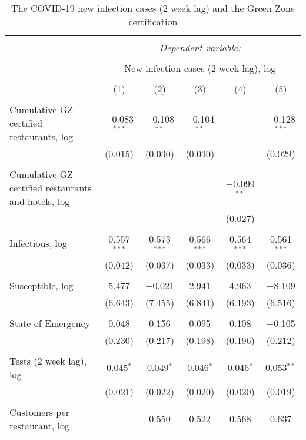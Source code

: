 
\begin{table}[!htbp] \centering 
  \caption{The COVID-19 new infection cases (2 week lag) and the Green Zone certification} 
  \label{} 
\begin{tabular}{@{\extracolsep{5pt}}lccccc} 
\\[-1.8ex]\hline 
\hline \\[-1.8ex] 
 & \multicolumn{5}{c}{\textit{Dependent variable:}} \\ 
\cline{2-6} 
\\[-1.8ex] & \multicolumn{5}{c}{New infection cases (2 week lag), log} \\ 
\\[-1.8ex] & (1) & (2) & (3) & (4) & (5)\\ 
\hline \\[-1.8ex] 
 Cumulative GZ-certified restaurants, log & $-$0.083$^{***}$ & $-$0.108$^{**}$ & $-$0.104$^{**}$ &  & $-$0.128$^{***}$ \\ 
  & (0.015) & (0.030) & (0.030) &  & (0.029) \\ 
  & & & & & \\ 
 Cumulative GZ-certified restaurants and hotels, log &  &  &  & $-$0.099$^{**}$ &  \\ 
  &  &  &  & (0.027) &  \\ 
  & & & & & \\ 
 Infectious, log & 0.557$^{***}$ & 0.573$^{***}$ & 0.566$^{***}$ & 0.564$^{***}$ & 0.561$^{***}$ \\ 
  & (0.042) & (0.037) & (0.033) & (0.033) & (0.036) \\ 
  & & & & & \\ 
 Susceptible, log & 5.477 & $-$0.021 & 2.941 & 4.963 & $-$8.109 \\ 
  & (6.643) & (7.455) & (6.841) & (6.193) & (6.516) \\ 
  & & & & & \\ 
 State of Emergency & 0.048 & 0.156 & 0.095 & 0.108 & $-$0.105 \\ 
  & (0.230) & (0.217) & (0.198) & (0.196) & (0.212) \\ 
  & & & & & \\ 
 Tests (2 week lag), log & 0.045$^{*}$ & 0.049$^{*}$ & 0.046$^{*}$ & 0.046$^{*}$ & 0.053$^{**}$ \\ 
  & (0.021) & (0.022) & (0.020) & (0.020) & (0.019) \\ 
  & & & & & \\ 
 Customers per restaurant, log &  & 0.550 & 0.522 & 0.568 & 0.637 \\ 

\end{tabular}
\end{table}
